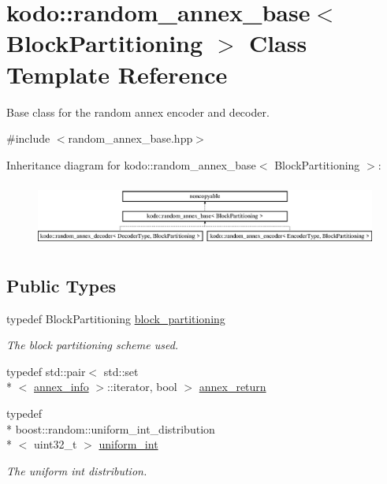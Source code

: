 \hypertarget{classkodo_1_1random__annex__base}{\section{kodo\-:\-:random\-\_\-annex\-\_\-base$<$ Block\-Partitioning $>$ Class Template Reference}
\label{classkodo_1_1random__annex__base}
}


Base class for the random annex encoder and decoder.  




{\ttfamily \#include $<$random\-\_\-annex\-\_\-base.\-hpp$>$}

Inheritance diagram for kodo\-:\-:random\-\_\-annex\-\_\-base$<$ Block\-Partitioning $>$\-:\begin{figure}[H]
\begin{center}
\leavevmode
\includegraphics[height=2.131979cm]{classkodo_1_1random__annex__base}
\end{center}
\end{figure}
\subsection*{Public Types}
\begin{DoxyCompactItemize}
\item 
\hypertarget{classkodo_1_1random__annex__base_a2853201f19ed35facc0d41a936379d17}{typedef Block\-Partitioning \hyperlink{classkodo_1_1random__annex__base_a2853201f19ed35facc0d41a936379d17}{block\-\_\-partitioning}}\label{classkodo_1_1random__annex__base_a2853201f19ed35facc0d41a936379d17}

\begin{DoxyCompactList}\small\item\em The block partitioning scheme used. \end{DoxyCompactList}\item 
typedef std\-::pair$<$ std\-::set\\*
$<$ \hyperlink{structkodo_1_1annex__info}{annex\-\_\-info} $>$\-::iterator, bool $>$ \hyperlink{classkodo_1_1random__annex__base_abbc4827931452604ab1ea4546462c588}{annex\-\_\-return}
\item 
\hypertarget{classkodo_1_1random__annex__base_ab35772eb5e7d4dbd74fbdea0c7bb04c7}{typedef \\*
boost\-::random\-::uniform\-\_\-int\-\_\-distribution\\*
$<$ uint32\-\_\-t $>$ \hyperlink{classkodo_1_1random__annex__base_ab35772eb5e7d4dbd74fbdea0c7bb04c7}{uniform\-\_\-int}}\label{classkodo_1_1random__annex__base_ab35772eb5e7d4dbd74fbdea0c7bb04c7}

\begin{DoxyCompactList}\small\item\em The uniform int distribution. \end{DoxyCompactList}\end{DoxyCompactItemize}
